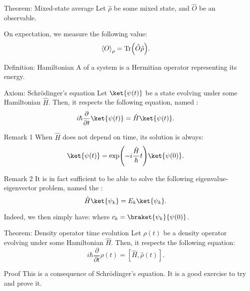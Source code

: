 \documentclass[a4paper]{article}
\begin{document}
\begin{parag}{Theorem: Mixed-state average}
    Let $\hat{\rho}$ be some mixed state, and $\hat{O}$ be an observable.

    On expectation, we measure the following value: 
    \[\left\langle O \right\rangle_{\rho} = \Tr\left(\hat{O} \hat{\rho}\right).\]
\end{parag}

\begin{parag}{Definition: Hamiltonian}
    A  of a system is a Hermitian operator representing its energy.
\end{parag}

\begin{parag}{Axiom: Schrödinger's equation}
    Let $\ket{\psi\left(t\right)}$ be a state evolving under some Hamiltonian $\hat{H}$. Then, it respects the following equation, named : 
    \[i \hbar \frac{\partial}{\partial t} \ket{\psi\left(t\right)} = \hat{H} \ket{\psi\left(t\right)}.\]

    \begin{subparag}{Remark 1}
        When $\hat{H}$ does not depend on time, its solution is always: 
        \[\ket{\psi\left(t\right)} = \exp\left(-i \frac{\hat{H}}{\hbar} t\right)\ket{\psi\left(0\right)}.\]
    \end{subparag}

    \begin{subparag}{Remark 2}
        It is in fact sufficient to be able to solve the following eigenvalue-eigenvector problem, named the : 
        \[\hat{H} \ket{\psi_k} = E_k \ket{\psi_k}.\]

        Indeed, we then simply have:
        where $c_k = \braket{\psi_k}{\psi\left(0\right)}$.
    \end{subparag}
\end{parag}

\begin{parag}{Theorem: Density operator time evolution}
    Let $\rho\left(t\right)$ be a density operator evolving under some Hamiltonian $\hat{H}$. Then, it respects the following equation: 
    \[i \hbar \frac{\partial}{\partial t} \hat{\rho}\left(t\right) = \left[\hat{H}, \hat{\rho}\left(t\right)\right].\]
    
    \begin{subparag}{Proof}
        This is a consequence of Schrödinger's equation. It is a good exercise to try and prove it.
    \end{subparag}
\end{parag}
\end{document}
